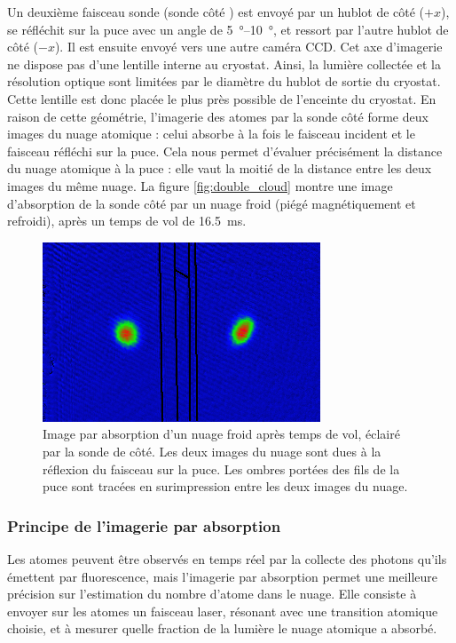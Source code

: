 Un deuxième faisceau sonde (\og sonde côté \fg{}) est envoyé par un hublot de côté ($+x$), se réfléchit sur la puce avec un angle de \SIrange{5}{10}{\degree}, et ressort par l'autre hublot de côté ($-x$). Il est ensuite envoyé vers une autre caméra CCD.
Cet axe d'imagerie ne dispose pas d'une lentille interne au cryostat. Ainsi, la lumière collectée et la résolution optique sont limitées par le diamètre du hublot de sortie du cryostat.
Cette lentille est donc placée le plus près possible de l'enceinte du cryostat.
En raison de cette géométrie, l'imagerie des atomes par la sonde côté forme deux images du nuage atomique : celui absorbe à la fois le faisceau incident et le faisceau réfléchi sur la puce.
Cela nous permet d'évaluer précisément la distance du nuage atomique à la puce : elle vaut la moitié de la distance entre les deux images du même nuage.
La figure \eqref{fig:double_cloud} montre une image d'absorption de la sonde côté par un nuage froid (piégé magnétiquement et refroidi), après un temps de vol de \SI{16.5}{\ms}.
%	
\begin{figure}[!h]
\centering
\includegraphics[width=.6\linewidth]{figures/setup/coldatoms/double_cloud_withWires}
\caption[Image par absorption du nuage par la sonde côté]{Image par absorption d'un nuage froid après temps de vol, éclairé par la sonde de côté. Les deux images du nuage sont dues à la réflexion du faisceau sur la puce.
Les ombres portées des fils de la puce sont tracées en surimpression entre les deux images du nuage.
}
\label{fig:double_cloud}
\end{figure}

	\subsubsection*{Principe de l'imagerie par absorption}
	
Les atomes peuvent être observés en temps réel par la collecte des photons qu'ils émettent par fluorescence, mais l'imagerie par absorption permet une meilleure précision sur l'estimation du nombre d'atome dans le nuage.
Elle consiste à envoyer sur les atomes un faisceau laser, résonant avec une transition atomique choisie, et à mesurer quelle fraction de la lumière le nuage atomique a absorbé.


